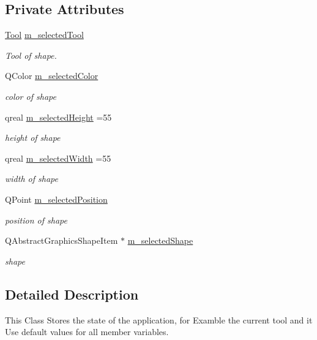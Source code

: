 \subsection*{Private Attributes}
\begin{DoxyCompactItemize}
\item 
\mbox{\hyperlink{classapp_1_1_app_state_aa641298e5827611da2512591c4a0e966}{Tool}} \mbox{\hyperlink{classapp_1_1_app_state_a80f8f7a574b269f73119edd2ed96f192}{m\+\_\+selected\+Tool}}
\begin{DoxyCompactList}\small\item\em Tool of shape. \end{DoxyCompactList}\item 
Q\+Color \mbox{\hyperlink{classapp_1_1_app_state_a5ad9b96983f21e5718f84d1571f15b7b}{m\+\_\+selected\+Color}}
\begin{DoxyCompactList}\small\item\em color of shape \end{DoxyCompactList}\item 
qreal \mbox{\hyperlink{classapp_1_1_app_state_a22f0a67d5db0c430d32306383491d316}{m\+\_\+selected\+Height}} =55
\begin{DoxyCompactList}\small\item\em height of shape \end{DoxyCompactList}\item 
qreal \mbox{\hyperlink{classapp_1_1_app_state_ad90790bef930b14bdee28a7fb2988c85}{m\+\_\+selected\+Width}} =55
\begin{DoxyCompactList}\small\item\em width of shape \end{DoxyCompactList}\item 
Q\+Point \mbox{\hyperlink{classapp_1_1_app_state_a08af1ba9a3d291aa855e84419588db4f}{m\+\_\+selected\+Position}}
\begin{DoxyCompactList}\small\item\em position of shape \end{DoxyCompactList}\item 
Q\+Abstract\+Graphics\+Shape\+Item $\ast$ \mbox{\hyperlink{classapp_1_1_app_state_a02857da24d9d464ea4e1ffcab7f3c5cf}{m\+\_\+selected\+Shape}}
\begin{DoxyCompactList}\small\item\em shape \end{DoxyCompactList}\end{DoxyCompactItemize}


\subsection{Detailed Description}
This Class Stores the state of the application, for Examble the current tool and it Use default values for all member variables. 

